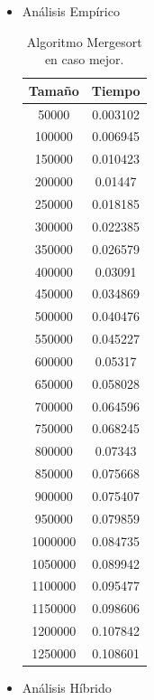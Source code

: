 \documentclass[a4paper,12pt,twoside]{article} %
\begin{document}
	\begin{itemize}
	\item Análisis Empírico
	
	\begin{table}[h]
	\begin{center}
		\begin{tabular}{|c|c|}
		\hline
		Tamaño & Tiempo \\
		\hline
		50000 & 0.003102 \\
		100000 & 0.006945 \\
		150000 & 0.010423 \\
		200000 & 0.01447 \\
		250000 & 0.018185 \\
		300000 & 0.022385 \\
		350000 & 0.026579 \\
		400000 & 0.03091 \\
		450000 & 0.034869 \\
		500000 & 0.040476 \\
		550000 & 0.045227 \\
		600000 & 0.05317 \\
		650000 & 0.058028 \\
		700000 & 0.064596 \\
		750000 & 0.068245 \\
		800000 & 0.07343 \\
		850000 & 0.075668 \\
		900000 & 0.075407 \\
		950000 & 0.079859 \\
		1000000 & 0.084735 \\
		1050000 & 0.089942 \\
		1100000 & 0.095477 \\
		1150000 & 0.098606 \\
		1200000 & 0.107842 \\
		1250000 & 0.108601 \\
		\hline
		\end{tabular}
	\end{center}
	\caption{Algoritmo Mergesort en caso mejor.}
\end{table}
\newpage
	
	\item Análisis Híbrido
\begin{figure}[h]
  \begin{center}
  

\end{center}
\end{figure}
\end{itemize}
\end{document}
